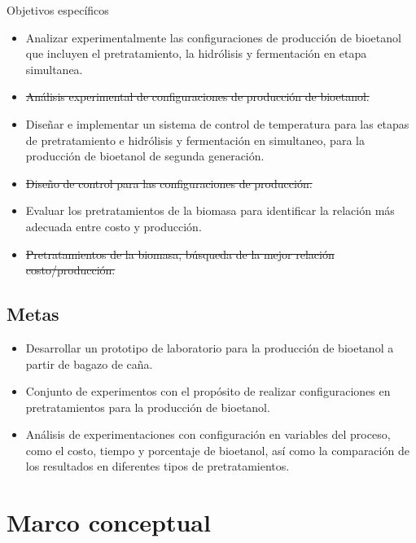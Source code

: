 \documentclass[12pt]{article}
\begin{document}
	{\large Objetivos específicos}
	
	\begin{itemize}
		\item 
		Analizar experimentalmente las configuraciones de producción de bioetanol que incluyen el pretratamiento, la hidrólisis y fermentación en etapa simultanea.
		\item  \sout{Análisis experimental de configuraciones de producción de bioetanol.}
		\item 	Diseñar e implementar un sistema de control de temperatura para las etapas de pretratamiento e hidrólisis y fermentación en simultaneo, para la producción de bioetanol de segunda generación.
			
		\item  \sout{Diseño de control para las configuraciones de producción.}
		
		\item 
       Evaluar los pretratamientos de la biomasa para identificar la relación más adecuada entre costo y producción.
      \item \sout{Pretratamientos de la biomasa, búsqueda de la mejor relación costo/producción.}
	\end{itemize}
	
	\subsection{Metas}
	
	\begin{itemize}

		\item 
		Desarrollar un prototipo de laboratorio para la producción de bioetanol a partir de bagazo de caña.
		
		\item 
		Conjunto de experimentos con el propósito de realizar configuraciones en pretratamientos para la producción de bioetanol. 
		
		
		\item 
		Análisis de experimentaciones con configuración en variables del proceso, como el costo, tiempo y porcentaje de bioetanol, así como la comparación de los resultados en diferentes tipos de pretratamientos.
		
	
		
	\end{itemize}
	\newpage
	
	\section{Marco conceptual}
	
\end{document}
